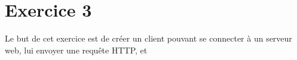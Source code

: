 \section{Exercice 3}
Le but de cet exercice est de créer un client pouvant se connecter à un serveur web, lui envoyer une requête HTTP, et %


